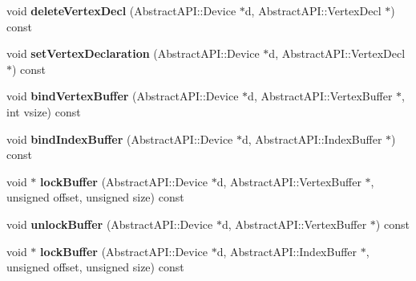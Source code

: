 \begin{DoxyCompactItemize}
\item 
\hypertarget{class_tempest_1_1_direct_x9_a79009a974507370df1af9d9fca3fac47}{void {\bfseries delete\+Vertex\+Decl} (Abstract\+A\+P\+I\+::\+Device $\ast$d, Abstract\+A\+P\+I\+::\+Vertex\+Decl $\ast$) const }\label{class_tempest_1_1_direct_x9_a79009a974507370df1af9d9fca3fac47}

\item 
\hypertarget{class_tempest_1_1_direct_x9_aa20b7a4d0bfafe8c1378a6277effe7ac}{void {\bfseries set\+Vertex\+Declaration} (Abstract\+A\+P\+I\+::\+Device $\ast$d, Abstract\+A\+P\+I\+::\+Vertex\+Decl $\ast$) const }\label{class_tempest_1_1_direct_x9_aa20b7a4d0bfafe8c1378a6277effe7ac}

\item 
\hypertarget{class_tempest_1_1_direct_x9_a2ac117479f31e3cea42038145b9ca317}{void {\bfseries bind\+Vertex\+Buffer} (Abstract\+A\+P\+I\+::\+Device $\ast$d, Abstract\+A\+P\+I\+::\+Vertex\+Buffer $\ast$, int vsize) const }\label{class_tempest_1_1_direct_x9_a2ac117479f31e3cea42038145b9ca317}

\item 
\hypertarget{class_tempest_1_1_direct_x9_aa47203fe22b9e0d6223dc96644588704}{void {\bfseries bind\+Index\+Buffer} (Abstract\+A\+P\+I\+::\+Device $\ast$d, Abstract\+A\+P\+I\+::\+Index\+Buffer $\ast$) const }\label{class_tempest_1_1_direct_x9_aa47203fe22b9e0d6223dc96644588704}

\item 
\hypertarget{class_tempest_1_1_direct_x9_ac0a105d9a2dd57c36925d31e60264dd9}{void $\ast$ {\bfseries lock\+Buffer} (Abstract\+A\+P\+I\+::\+Device $\ast$d, Abstract\+A\+P\+I\+::\+Vertex\+Buffer $\ast$, unsigned offset, unsigned size) const }\label{class_tempest_1_1_direct_x9_ac0a105d9a2dd57c36925d31e60264dd9}

\item 
\hypertarget{class_tempest_1_1_direct_x9_a6ca1f32816c7c3210cd018de5257fb72}{void {\bfseries unlock\+Buffer} (Abstract\+A\+P\+I\+::\+Device $\ast$d, Abstract\+A\+P\+I\+::\+Vertex\+Buffer $\ast$) const }\label{class_tempest_1_1_direct_x9_a6ca1f32816c7c3210cd018de5257fb72}

\item 
\hypertarget{class_tempest_1_1_direct_x9_aa37bda6c3ea2a5d5c006efc7f5bd46ee}{void $\ast$ {\bfseries lock\+Buffer} (Abstract\+A\+P\+I\+::\+Device $\ast$d, Abstract\+A\+P\+I\+::\+Index\+Buffer $\ast$, unsigned offset, unsigned size) const }\label{class_tempest_1_1_direct_x9_aa37bda6c3ea2a5d5c006efc7f5bd46ee}


\end{DoxyCompactItemize}
